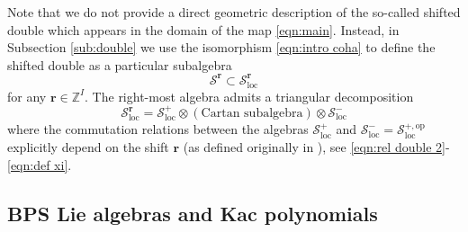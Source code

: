 \documentclass{amsart}
\def\CS{{\mathcal{S}}}
\def\br{{\mathbf{r}}}
\def\zz{{\mathbb{Z}^I}}
\begin{document}
\medskip 

\noindent Note that we do not provide a direct geometric description of the so-called shifted double which appears in the domain of the map \eqref{eqn:main}. Instead, in Subsection \ref{sub:double} we use the isomorphism \eqref{eqn:intro coha} to define the shifted double as a particular subalgebra
$$
\CS^{\br} \subset \CS^{\br}_{\text{loc}}
$$
for any $\br \in \zz$. The right-most algebra admits a triangular decomposition
$$
\CS^{\br}_{\text{loc}} = \CS^+_{\text{loc}} \otimes (\text{Cartan subalgebra}) \otimes \CS^-_{\text{loc}}
$$
where the commutation relations between the algebras $\CS^+_{\text{loc}}$ and $\CS^-_{\text{loc}} = \CS^{+,\text{op}}_{\text{loc}}$ explicitly depend on the shift $\br$ (as defined originally in \cite{BK, KWWY}), see \eqref{eqn:rel double 2}-\eqref{eqn:def xi}.

\medskip 

\subsection{BPS Lie algebras and Kac polynomials} 
\label{sub:bps intro}
\end{document}

